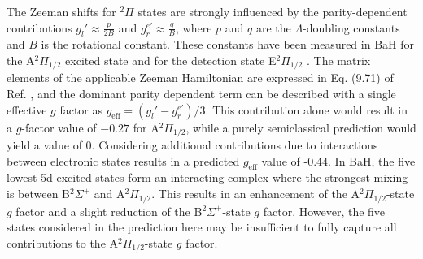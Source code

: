 \documentclass[amsmath,amssymb,aps,twocolumn,longbibliography,notitlepage]{revtex4-1}
\begin{document}
The Zeeman shifts for $^2\Pi$ states are strongly influenced by the parity-dependent contributions $g_{l}'\approx\frac{p}{2B}$ and $g_{r}^{e'}\approx\frac{q}{B}$, where $p$ and $q$ are the $\Lambda$-doubling constants and $B$ is the rotational constant.  These constants have been measured in BaH for the A$^2\Pi_{1/2}$ excited state \cite{GuntschKoppFysik66_BaHRotationalAXBand} and for the detection state E$^2\Pi_{1/2}$ \cite{VergesFabreJPB87_BaHDeltaState}.  The matrix elements of the applicable Zeeman Hamiltonian are expressed in Eq. (9.71) of Ref. \cite{BrownCarrington}, and the dominant parity dependent term can be described with a single effective $g$ factor as
$g_{\mathrm{eff}}=(g_l'-g_{r}^{e'})/3$.  This contribution alone would result in a $g$-factor value of $-0.27$ for A$^2\Pi_{1/2}$, while a purely semiclassical prediction would yield a value of 0.
Considering additional contributions due to interactions between electronic states results in a predicted $g_{\mathrm{eff}}$ value of -0.44.  In BaH, the five lowest 5d excited states form an interacting complex \cite{BarrowBernardMP89_BaH5dStates} where the strongest mixing is between B$^2\Sigma^+$ and A$^2\Pi_{1/2}$.  This results in an enhancement of the A$^2\Pi_{1/2}$-state $g$ factor and a slight reduction of the B$^2\Sigma^+$-state $g$ factor. However, the five states considered in the prediction here may be insufficient to fully capture all contributions to the A$^2\Pi_{1/2}$-state $g$ factor.
\end{document}
